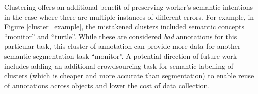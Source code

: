 \par Clustering offers an additional benefit of preserving worker's semantic intentions in the case where there are multiple instances of different errors. For example, in Figure \ref{cluster_example}, the mistakened clusters included semantic concepts ``monitor'' and ``turtle''. While these are considered \textit{bad} annotations for this particular task, this cluster of annotation can provide more data for another semantic segmentation task ``monitor''. A potential direction of future work includes adding an additional crowdsourcing task for semantic labelling of clusters (which is cheaper and more accurate than segmentation) to enable reuse of annotations across objects and lower the cost of data collection. 